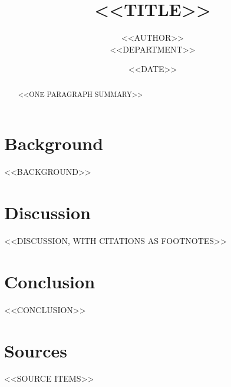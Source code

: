 \documentclass[11pt,a4paper]{article}
\title{\bfseries <<TITLE>>}
\author{<<AUTHOR>> \\ \small <<DEPARTMENT>>}
\date{<<DATE>>}
\begin{document}
\maketitle

\begin{abstract}
\noindent <<ONE PARAGRAPH SUMMARY>>
\end{abstract}

\section{Background}
<<BACKGROUND>>

\section{Discussion}
<<DISCUSSION, WITH CITATIONS AS FOOTNOTES>>

\section{Conclusion}
<<CONCLUSION>>

\section*{Sources}
\begin{itemize}[leftmargin=*]
  <<SOURCE ITEMS>>
\end{itemize}
\end{document}
